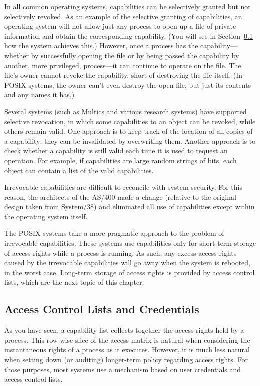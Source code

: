 In all common operating systems, capabilities can be selectively
granted but not selectively revoked.  As an example of the selective
granting of capabilities, an operating system will not allow just any
process to open up a file of private information and obtain the
corresponding capability.  (You will see in Section~\ref{acl-subsection} how the
system achieves this.)  However, once a process has the
capability---whether by successfully opening the file or by being
passed the capability by another, more privileged, process---it can
continue to operate on the file.  The file's owner cannot revoke the
capability, short of destroying the file itself.  (In POSIX systems,
the owner can't even destroy the open file, but just its contents and any
names it has.)

Several systems (such as Multics and various research systems) have
supported selective revocation, in which some capabilities to an
object can be revoked, while others remain valid.  One approach is to
keep track of the location of all copies of a capability; they can be
invalidated by overwriting them.  Another approach is to check whether
a capability is still valid each time it is used to request an
operation.  For example, if capabilities are large random strings of
bits, each object can contain a list of the valid capabilities.

Irrevocable capabilities are difficult to reconcile with system
security.  For this reason, the architects of the AS/400
made a change (relative to the original design taken from
System/38) and eliminated all use of capabilities
except within the operating system itself.

The POSIX systems take a more pragmatic approach to the problem of
irrevocable capabilities.  These systems use capabilities only for
short-term storage of access rights while a process is running.  As
such, any excess access rights caused by the irrevocable capabilities
will go away when the system is rebooted, in the worst case.
Long-term storage of access rights is provided by access control
lists, which are the next topic of this chapter.

\subsection{Access Control Lists and Credentials}\label{acl-subsection}

As you have seen, a capability list collects together the access rights
held by a process.  This row-wise slice of the access matrix is
natural when considering the instantaneous rights of a process as it
executes.  However, it is much less natural when setting down (or
auditing) longer-term policy regarding access rights.  For those
purposes, most systems use a mechanism based on user credentials and
access control lists.

